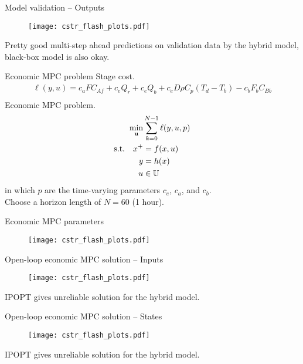 \documentclass[xcolor=dvipsnames, 8pt]{beamer} %
\newcommand{\useq}{\mathbf{u}}
\newcommand{\bbU}{\mathbb{U}}
\begin{document}
\begin{frame}{Model validation -- Outputs}
	\vspace{-0.1in}
	\begin{figure}
	\centering
	\texttt{[image: cstr\_flash\_plots.pdf]}
	\end{figure}
	\vspace{-0.2in}
Pretty good multi-step ahead predictions on validation data 
by the hybrid model, black-box model is also okay. 
\end{frame}

\begin{frame}{Economic MPC problem}
	Stage cost.
\begin{align*}
\ell(y, u) = c_aFC_{Af} + c_eQ_r + 
		c_eQ_b + c_eD\rho C_p(T_d-T_b) - 
		c_bF_bC_{Bb} \\
\end{align*}
Economic MPC problem.
\begin{align*}
	\min_{\useq} & 
  \sum_{k=0}^{N-1} \ell(y, u, p) \\
	\textnormal{s.t.} \quad   x^+ &= f(x, u)\\
	y &= h(x) \\ 
	u &\in \bbU
  \end{align*}
  in which $p$ are the time-varying parameters $c_e$, $c_a$, and $c_b$. \\
  Choose a horizon length of $N=60$ (1 hour). 
\end{frame}
		
\begin{frame}{Economic MPC parameters}
		\begin{figure}
		\centering
		\texttt{[image: cstr\_flash\_plots.pdf]}
		\end{figure}
\end{frame}
	
\begin{frame}{Open-loop economic MPC solution -- Inputs}
	\vspace{-0.1in}
		\begin{figure}
		\centering
		\texttt{[image: cstr\_flash\_plots.pdf]}
		\end{figure}
		\vspace{-0.2in}
	IPOPT gives unreliable solution for the hybrid model.
\end{frame}
	
\begin{frame}{Open-loop economic MPC solution -- States}
	\vspace{-0.1in}
	\begin{figure}
	\centering
	\texttt{[image: cstr\_flash\_plots.pdf]}
	\end{figure}
	\vspace{-0.2in}
	IPOPT gives unreliable solution for the hybrid model.
\end{frame}
\end{document}
